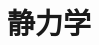\chapter{静力学}
\begin{comment}
以运动学和动力学理论为基础,\,时不时地,\,我们发现一些典型的现象,\,包括:
\begin{itemize}
	\item 不管体系多么复杂,\,能量函数对其行为似乎起决定性的作用.
	\item 似乎总是能够从不同的体系中抽象出它的一个特征数字:\,自由度.
	\item 约束越多体系约复杂,\,它的未知约束力越来越多,\,但是多到一定程度体系只剩下一个自由度了反而用能量守恒就能够解答大多数问题.
\end{itemize}

这些现象无疑是紧密联系的,\,值得研究的.\,事实上我们要做的就是以之前的所有动力学定律为依据进一步展开讨论.\,再从头开始建立新的理论:\,先讨论运动的描述,\,再单独研究力的特性.\,最后合到一起,\,看看这能让我们得到什么.

新理论,\, 新思想,\, 新图像.\,在本章节的学习过程中,\, 如果感到疑惑,\, 大抵都是复杂的数学推导掩盖了背后的物理目的.\, 希望读者先记住两点:\,一是,\,我们要做的是把以前对质点,\,刚体和对质点系列的选取自然坐标(大抵是直角座标)而列的部分定理修改为改用广义坐标来描述,\,过程中的所有步骤都是为这个目的来服务的.\, 二是,\,本着``能量函数的形式''就决定``体系的一切结构与演化''的观点,\,我们就能找到一个明确的方向.\,无论是从结果上还是从细节上,\,我们将会多次参考这种想法.

\section{约束}
所谓\emph{约束}(constraint)就是对运动的限制.\,有时,\,物体发生直接的接触,\,或是一个物体在另一个物体表面滑动或是滚动,\,这种情况约束实际上就发生了;\,有时,\,约束通过往往是轻质\footnote{后面就能理解,\,这样才不会占用新的广义坐标,\,因为它不带来任何能量}的绳,\,直杆或曲杆,\,套筒,\,无摩擦的铰链等等去连接两个乃至多个物体,\,这样那些物体之间实际上也存在约束,\,偶尔我们也会把连接它们的机构直接叫做约束.

之所以把它们叫做约束,\,是因为它们产生了两个共同的结果,\,一是\emph{约束方程}(equation of constraint),\,二是\emph{约束力}(force of constraint).\,根据前者的运动学效果\footnote{根据后者的动力学效果还可以分为理想和非理想约束,\,见后面小节平衡问题:\,虚功原理},\,我们把与约束分为以下类别:

\subsection{约束分类}


\end{comment}
